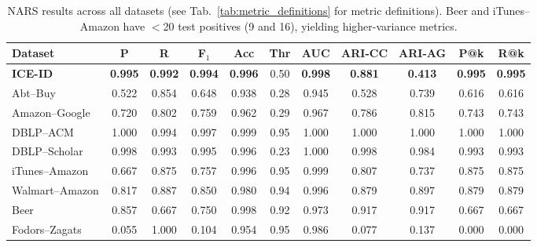 \documentclass{article}
\begin{document}
\begin{table}[H]
  \centering
  \tiny
    \caption{NARS results across all datasets (see Tab.~\ref{tab:metric_definitions} for metric definitions). Beer and iTunes--Amazon have $<$20 test positives (9 and 16), yielding higher-variance metrics.}
  \begin{tabular}{lcccccccccc}
    \toprule
    Dataset & P & R & F$_1$ & Acc & Thr & AUC & ARI-CC & ARI-AG & P@k & R@k \\
    \midrule
    \textbf{ICE-ID} & \textbf{0.995} & \textbf{0.992} & \textbf{0.994} & \textbf{0.996} & 0.50 & \textbf{0.998} & \textbf{0.881} & \textbf{0.413} & \textbf{0.995} & \textbf{0.995} \\
    Abt--Buy       & 0.522 & 0.854 & 0.648 & 0.938 & 0.28 & 0.945 & 0.528 & 0.739 & 0.616 & 0.616 \\
    Amazon--Google & 0.720 & 0.802 & 0.759 & 0.962 & 0.29 & 0.967 & 0.786 & 0.815 & 0.743 & 0.743 \\
    DBLP--ACM      & 1.000 & 0.994 & 0.997 & 0.999 & 0.95 & 1.000 & 1.000 & 1.000 & 1.000 & 1.000 \\
    DBLP--Scholar  & 0.998 & 0.993 & 0.995 & 0.996 & 0.23 & 1.000 & 0.998 & 0.984 & 0.993 & 0.993 \\
    iTunes--Amazon & 0.667 & 0.875 & 0.757 & 0.996 & 0.95 & 0.999 & 0.807 & 0.737 & 0.875 & 0.875 \\
    Walmart--Amazon & 0.817 & 0.887 & 0.850 & 0.980 & 0.94 & 0.996 & 0.879 & 0.897 & 0.879 & 0.879 \\
    Beer           & 0.857 & 0.667 & 0.750 & 0.998 & 0.92 & 0.973 & 0.917 & 0.917 & 0.667 & 0.667 \\
    Fodors--Zagats & 0.055 & 1.000 & 0.104 & 0.954 & 0.95 & 0.986 & 0.077 & 0.137 & 0.000 & 0.000 \\
    \bottomrule
  \end{tabular}

  \label{tab:nars_horizontal}
\end{table}
\end{document}
